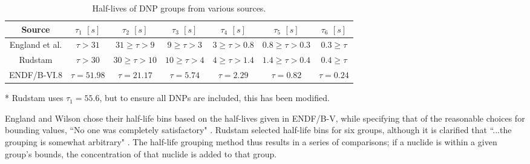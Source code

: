 \renewcommand{\arraystretch}{1.25}
\begin{table}[H]
    \centering
    \begin{threeparttable}
    \caption{Half-lives of \gls{DNP} groups from various sources.}
    \begin{tabular}{ccccccc}
    \hline
       Source  & $\tau_1$ $[s]$ &  $\tau_2$ $[s]$ & $\tau_3$ $[s]$ & $\tau_4$ $[s]$ & $\tau_5$ $[s]$ & $\tau_6$ $[s]$\\
       \hline
        England et al. \cite{england1983aggregate} & $\tau > 31$ & $31 \geq \tau > 9$ &  $9 \geq \tau > 3$ & $3 \geq \tau > 0.8$ & $0.8 \geq \tau > 0.3$ & $0.3 \geq \tau$ \\
        Rudstam \cite{rudstam1982six}\tnote{*} & $\tau > 30$ & $30 \geq \tau > 10$ & $10 \geq \tau > 4$ & $4 \geq \tau > 1.4$ & $1.4 \geq \tau > 0.4$ & $0.4 \geq \tau$\\
        ENDF/B-VI.8 \cite{endf6} & $\tau = 51.98$ & $\tau = 21.17$ & $\tau = 5.74$ & $\tau = 2.29$ & $\tau = 0.82$ & $\tau = 0.24$\\

        \hline
    \end{tabular}
        \begin{tablenotes}
      \item[*] Rudstam uses $\tau_1 = 55.6$, but to ensure all \glspl{DNP} are included, this has been modified.
    \end{tablenotes}
    \label{tab:halfgroup}
\end{threeparttable}
\end{table}
\renewcommand{\arraystretch}{1}

England and Wilson chose their half-life bins based on the half-lives given in ENDF/B-V, while specifying that of the reasonable choices for bounding values, ``No one was completely satisfactory" \cite{england1983aggregate}.
Rudstam selected half-life bins for six groups, although it is clarified that ``...the grouping is somewhat arbitrary" \cite{rudstam1982six}.
The half-life grouping method thus results in a series of comparisons; if a nuclide is within a given group's bounds, the concentration of that nuclide is added to that group.

